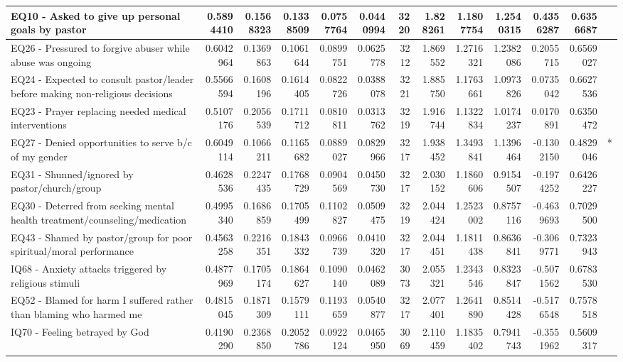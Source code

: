 \documentclass[
  letterpaper,
]{article}
\begin{document}
\begin{table}
\begin{tabular}{l|r|r|r|r|r|r|r|r|r|r|r|l}
EQ10 - Asked to give up personal goals by pastor & 0.5894410 & 0.1568323 & 0.1338509 & 0.0757764 & 0.0440994 & 3220 & 1.828261 & 1.1807754 & 1.2540315 & 0.4356287 & 0.6356687 & \\
\hline
EQ26 - Pressured to forgive abuser while abuse was ongoing & 0.6042964 & 0.1369863 & 0.1061644 & 0.0899751 & 0.0625778 & 3212 & 1.869552 & 1.2716321 & 1.2382086 & 0.2055715 & 0.6569027 & \\
\hline
EQ24 - Expected to consult pastor/leader before making non-religious decisions & 0.5566594 & 0.1608196 & 0.1614405 & 0.0822726 & 0.0388078 & 3221 & 1.885750 & 1.1763661 & 1.0973826 & 0.0735042 & 0.6627536 & \\
\hline
EQ23 - Prayer replacing needed medical interventions & 0.5107176 & 0.2056539 & 0.1711712 & 0.0810811 & 0.0313762 & 3219 & 1.916744 & 1.1322834 & 1.0174237 & 0.0170891 & 0.6350472 & \\
\hline
EQ27 - Denied opportunities to serve b/c of my gender & 0.6049114 & 0.1066211 & 0.1165682 & 0.0889027 & 0.0829966 & 3217 & 1.938452 & 1.3493841 & 1.1396464 & -0.1302150 & 0.4829046 & *\\
\hline
EQ31 - Shunned/ignored by pastor/church/group & 0.4628536 & 0.2247435 & 0.1768729 & 0.0904569 & 0.0450730 & 3217 & 2.030152 & 1.1860606 & 0.9154507 & -0.1974252 & 0.6426227 & \\
\hline
EQ30 - Deterred from seeking mental health treatment/counseling/medication & 0.4995340 & 0.1686859 & 0.1705499 & 0.1102827 & 0.0509475 & 3219 & 2.044424 & 1.2523002 & 0.8757116 & -0.4639693 & 0.7029500 & \\
\hline
EQ43 - Shamed by pastor/group for poor spiritual/moral performance & 0.4563258 & 0.2216351 & 0.1843332 & 0.0966739 & 0.0410320 & 3217 & 2.044451 & 1.1811438 & 0.8636841 & -0.3069771 & 0.7323943 & \\
\hline
IQ68 - Anxiety attacks triggered by religious stimuli & 0.4877969 & 0.1705174 & 0.1864627 & 0.1090140 & 0.0462089 & 3073 & 2.055321 & 1.2343546 & 0.8323847 & -0.5071562 & 0.6783530 & \\
\hline
EQ52 - Blamed for harm I suffered rather than blaming who harmed me & 0.4815045 & 0.1871309 & 0.1579111 & 0.1193659 & 0.0540877 & 3217 & 2.077401 & 1.2641890 & 0.8514428 & -0.5176548 & 0.7578518 & \\
\hline
IQ70 - Feeling betrayed by God & 0.4190290 & 0.2368850 & 0.2052786 & 0.0922124 & 0.0465950 & 3069 & 2.110459 & 1.1835402 & 0.7941743 & -0.3551962 & 0.5609317 & \\
\hline

\end{tabular}
\end{table}
\end{document}
